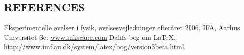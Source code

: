 \documentclass[danish,a4paper,twocolumn,amsmath,amssymb,floatfix]{revtex4-1}
\begin{document}
\begin{thebibliography}{99}
\section*{REFERENCES}

Eksperimentelle øvelser i fysik, øvelsesvejledninger efteråret 2006, IFA, Aarhus Universitet
	Se: \url{www.inkscape.com}
	Dalifs bog om \LaTeX. \url{http://www.imf.au.dk/system/latex/bog/version3beta.html}

\end{thebibliography}
\end{document}

